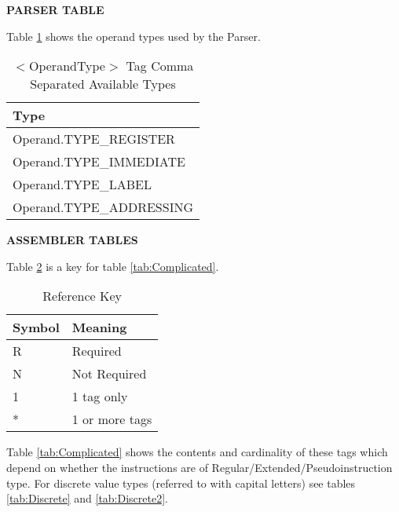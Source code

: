 \noindent \textbf{PARSER TABLE}

Table \ref{tab:Parser} shows the operand types used by the Parser.

\begin{table}[]
\begin{center}
	\begin{tabular}{|l|}
	\hline
	Type \\
	\hline
	Operand.TYPE\_REGISTER \\
	Operand.TYPE\_IMMEDIATE \\
	Operand.TYPE\_LABEL \\
	Operand.TYPE\_ADDRESSING \\
	\hline
	\end{tabular}
\caption{$<$OperandType$>$ Tag Comma Separated Available Types}
\label{tab:Parser}
\end{center}
\end{table}



\noindent \textbf{ASSEMBLER TABLES}

Table \ref{tab:RefKey} is a key for table \ref{tab:Complicated}.


\begin{table}[]
\begin{center}
	\begin{tabular}{|l|l|}
	\hline
	Symbol	&	Meaning \\
	\hline
	R	&	Required \\
	N	&	Not Required \\
	1	&	1 tag only \\
	*	&	1 or more tags \\
	\hline
	\end{tabular}
\caption{Reference Key}
\label{tab:RefKey}
\end{center}
\end{table}


Table \ref{tab:Complicated} shows the contents and cardinality of these tags which depend on whether the instructions are of Regular/Extended/Pseudoinstruction type. For discrete value types (referred to with capital letters) see tables \ref{tab:Discrete} and \ref{tab:Discrete2}.

